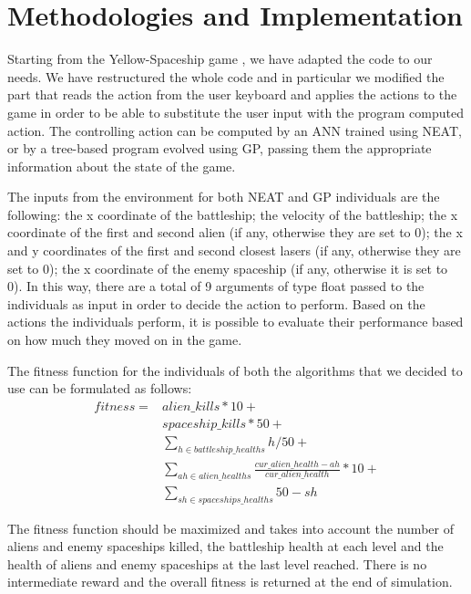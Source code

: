 
\section{Methodologies and Implementation}

Starting from the Yellow-Spaceship game \cite{Yellow-Spaceship}, we have adapted the code to our needs. We
have restructured the whole code and in particular we modified the part that reads the action
from the user keyboard and applies the actions to the game in order to be able to substitute
the user input with the program computed action. The controlling action can be computed by
an ANN trained using NEAT, or by a tree-based program evolved using GP, passing them
the appropriate information about the state of the game.

The inputs from the environment for both NEAT and GP individuals are the following:
the x coordinate of the battleship; the velocity of the battleship;
the x coordinate of the first and second alien (if any, otherwise they are set to 0);
the x and y coordinates of the first and second closest lasers (if any, otherwise they are set to 0);
the x coordinate of the enemy spaceship (if any, otherwise it is set to 0).
In this way, there are a total of 9 arguments of type float passed to the individuals as input in
order to decide the action to perform. Based on the actions the individuals perform, it is
possible to evaluate their performance based on how much they moved on in the game.

The fitness function for the individuals of both the algorithms that we decided to use can be
formulated as follows:
\begin{equation}
\begin{split}
    fitness = & alien\_kills * 10 + \\
              & spaceship\_kills * 50 + \\
              & \sum_{h \in battleship\_healths}^{} h / 50 + \\
              & \sum_{ah \in alien\_healths}^{} \frac{cur\_alien\_health - ah}{cur\_alien\_health} * 10 + \\
              & \sum_{sh \in spaceships\_healths}^{} 50 - sh
\end{split}
\end{equation}

The fitness function should be maximized and takes into account the number of aliens and
enemy spaceships killed, the battleship health at each level and the health of aliens and
enemy spaceships at the last level reached. There is no intermediate reward and the overall
fitness is returned at the end of simulation.

